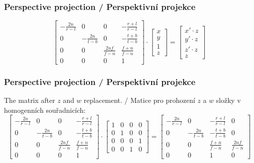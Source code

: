 \begin{frame}
\frametitle{Perspective projection / Perspektivní projekce}
{\tiny
\begin{equation}
\label{eq:persmat1}
\left[
\begin{array}{cccc} 
-\frac{2n}{r-l} & 0               & 0                & -\frac{r+l}{r-l} \\
0               & -\frac{2n}{t-b} & 0                & -\frac{t+b}{t-b} \\
0               & 0               & \frac{2nf}{f-n} & \frac{f+n}{f-n} \\
0               & 0               & 0                & 1
\end{array}
\right]
\cdot
\left[
\begin{array}{c}
x \\
y \\
1 \\
z
\end{array}
\right]
=
\left[
\begin{array}{c}
x'\cdot z \\
y'\cdot z \\
z'\cdot z \\
z
\end{array}
\right]
\end{equation}
}
\end{frame}

\begin{frame}
\frametitle{Perspective projection / Perspektivní projekce}
The matrix after $z$ and $w$ replacement. / Matice pro prohození $z$ a $w$ složky v homogenních souřadnicích:
{\tiny
\begin{equation}
\left[
\begin{array}{cccc} 
-\frac{2n}{r-l} & 0               & 0               & -\frac{r+l}{r-l} \\
0               & -\frac{2n}{t-b} & 0               & -\frac{t+b}{t-b} \\
0               & 0               & \frac{2nf}{f-n} & \frac{f+n}{f-n} \\
0               & 0               & 0               & 1
\end{array}
\right]
\cdot
\left[
\begin{array}{cccc} 
1 & 0 & 0 & 0 \\
0 & 1 & 0 & 0 \\
0 & 0 & 0 & 1 \\
0 & 0 & 1 & 0
\end{array}
\right]
=
\left[
\begin{array}{cccc} 
-\frac{2n}{r-l} & 0               & -\frac{r+l}{r-l} & 0 \\
0               & -\frac{2n}{t-b} & -\frac{t+b}{t-b} & 0 \\
0               & 0               & \frac{f+n}{f-n} & \frac{2nf}{f-n} \\
0               & 0               & 1                & 0
\end{array}
\right]
\end{equation}
}
\end{frame}

